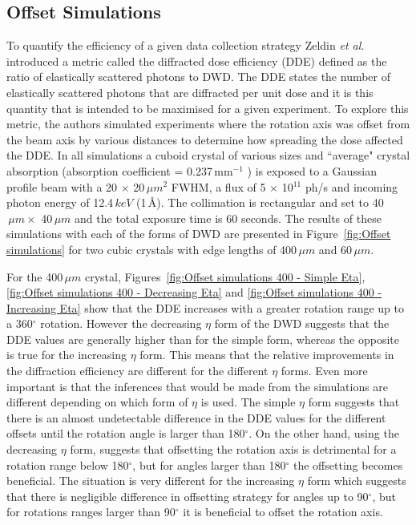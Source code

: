 \subsection{Offset Simulations}
\label{sub:Offset Simulations}
To quantify the efficiency of a given data collection strategy Zeldin \textit{et al.} introduced a metric called the diffracted dose efficiency (DDE) defined as the ratio of elastically scattered photons to DWD.
The DDE states the number of elastically scattered photons that are diffracted per unit dose and it is this quantity that is intended to be maximised for a given experiment.
To explore this metric, the authors simulated experiments where the rotation axis was offset from the beam axis by various distances to determine how spreading the dose affected the DDE.
In all simulations a cuboid crystal of various sizes and ``average" crystal absorption (absorption coefficient = 0.237$\,$mm$^{-1}$ \cite{zeldin2013}) is exposed to a Gaussian profile beam with a 20 $\times$ 20$\,\mu m^2$ FWHM, a flux of 5 $\times$ 10$^{11}$ ph/s and incoming photon energy of 12.4$\,keV$ (1$\,$\AA).
The collimation is rectangular and set to 40$\,\mu m \times$ 40$\,\mu m$ and the total exposure time is 60 seconds.
The results of these simulations with each of the forms of DWD are presented in Figure~\ref{fig:Offset simulations} for two cubic crystals with edge lengths of 400$\,\mu m$ and 60$\,\mu m$.

For the 400$\,\mu m$ crystal, Figures~\ref{fig:Offset simulations 400 - Simple Eta}, \ref{fig:Offset simulations 400 - Decreasing Eta} and \ref{fig:Offset simulations 400 - Increasing Eta} show that the DDE increases with a greater rotation range up to a 360$^{\circ}$ rotation.
However the decreasing $\eta$ form of the DWD suggests that the DDE values are generally higher than for the simple form, whereas the opposite is true for the increasing $\eta$ form.
This means that the relative improvements in the diffraction efficiency are different for the different $\eta$ forms.
Even more important is that the inferences that would be made from the simulations are different depending on which form of $\eta$ is used.
The simple $\eta$ form suggests that there is an almost undetectable difference in the DDE values for the different offsets until the rotation angle is larger than 180$^{\circ}$.
On the other hand, using the decreasing $\eta$ form, suggests that offsetting the rotation axis is detrimental for a rotation range below 180$^{\circ}$, but for angles larger than 180$^{\circ}$ the offsetting becomes beneficial.
The situation is very different for the increasing $\eta$ form which suggests that there is negligible difference in offsetting strategy for angles up to 90$^{\circ}$, but for rotations ranges larger than 90$^{\circ}$ it is beneficial to offset the rotation axis.

